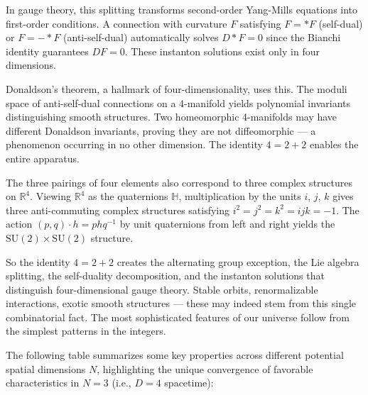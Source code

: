 In gauge theory, this splitting transforms second-order Yang-Mills equations into first-order conditions. A connection with curvature $F$ satisfying $F = *F$ (self-dual) or $F = -*F$ (anti-self-dual) automatically solves $D*F = 0$ since the Bianchi identity guarantees $DF = 0$. These instanton solutions exist only in four dimensions.

Donaldson's theorem, a hallmark of four-dimensionality, uses this. The moduli space of anti-self-dual connections on a 4-manifold yields polynomial invariants distinguishing smooth structures. Two homeomorphic 4-manifolds may have different Donaldson invariants, proving they are not diffeomorphic — a phenomenon occurring in no other dimension. The identity $4 = 2 + 2$ enables the entire apparatus.

The three pairings of four elements also correspond to three complex structures on $\mathbb{R}^4$. Viewing $\mathbb{R}^4$ as the quaternions $\mathbb{H}$, multiplication by the units $i$, $j$, $k$ gives three anti-commuting complex structures satisfying $i^2 = j^2 = k^2 = ijk = -1$. The action $(p,q) \cdot h = phq^{-1}$ by unit quaternions from left and right yields the $\mathrm{SU}(2) \times \mathrm{SU}(2)$ structure.

So the identity $4 = 2 + 2$ creates the alternating group exception, the Lie algebra splitting, the self-duality decomposition, and the instanton solutions that distinguish four-dimensional gauge theory. Stable orbits, renormalizable interactions, exotic smooth structures — these may indeed stem from this single combinatorial fact. The most sophisticated features of our universe follow from the simplest patterns in the integers.

The following table summarizes some key properties across different potential spatial dimensions $N$, highlighting the unique convergence of favorable characteristics in $N=3$ (i.e., $D=4$ spacetime):

\renewcommand{\arraystretch}{1.25}


